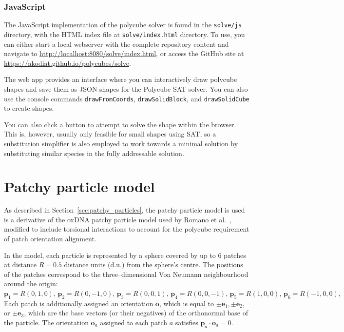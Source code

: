\subsection{JavaScript}
 The JavaScript implementation of the polycube solver is found in the \texttt{solve/js} directory, with the  HTML index file at \texttt{solve/index.html} directory. To use, you can either start a local webserver with the complete repository content and navigate to \url{http://localhost:8080/solve/index.html}, or access the GitHub site at \url{https://akodiat.github.io/polycubes/solve}.

 The web app provides an interface where you can interactively draw polycube shapes and save them as JSON shapes for the Polycube SAT solver. You can also use the console commands \texttt{drawFromCoords}, \texttt{drawSolidBlock}, and \texttt{drawSolidCube} to create shapes.

 You can also click a button to attempt to solve the shape within the browser. This is, however, usually only feasible for small shapes using SAT, so a substitution simplifier is also employed to work towards a minimal solution by substituting similar species in the fully addressable solution.


\chapter{Patchy particle model}
\label{ch:appendix_patchy}
As described in Section~\ref{sec:patchy_particles}, the patchy particle model is used is a derivative of the oxDNA patchy particle model used by Romano et al.\ \cite{rovigatti2015comparison}, modified to include torsional interactions to account for the polycube requirement of patch orientation alignment.

In the model, each particle is represented by a sphere covered by up to 6 patches at distance $R = 0.5$ distance units (d.u.) from the sphere's centre. The positions of the patches correspond to the three--dimensional Von Neumann neighbourhood around the origin:
$
 \mathbf{p}_1 = R \left( 0,1,0\right),\, \mathbf{p}_2 = R \left( 0,-1,0 \right),\,   %
 \mathbf{p}_3 = R \left( 0,0,1 \right),\, \mathbf{p}_4 = R \left(  0, 0, -1 \right),\, %
 \mathbf{p}_5 = R \left( 1,0,0 \right),\, \mathbf{p}_6 = R \left( -1, 0, 0 \right),
$
Each patch is additionally assigned an orientation $\mathbf{o}$, which is equal to
$\pm \mathbf{e}_1, \pm \mathbf{e}_2$, or $\pm \mathbf{e}_3$, which are the base vectors (or their negatives) of the orthonormal base of the particle. The orientation  $\mathbf{o}_a$ assigned to each patch $a$ satisfies $\mathbf{p}_a \cdot \mathbf{o}_a = 0$.

